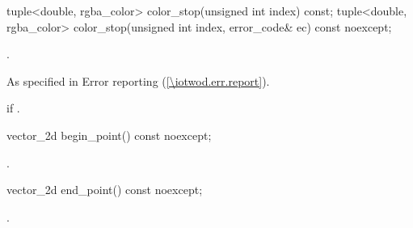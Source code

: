 \begin{itemdecl}
tuple<double, rgba_color> color_stop(unsigned int index) const;
tuple<double, rgba_color> color_stop(unsigned int index,
  error_code& ec) const noexcept;
\end{itemdecl}
\begin{itemdescr}
\pnum
\returns
{}.

\pnum
\throws
As specified in Error reporting (\ref{\iotwod.err.report}).

\pnum
\errors
{} if .
\end{itemdescr}

\begin{itemdecl}
vector_2d begin_point() const noexcept;
\end{itemdecl}
\begin{itemdescr}
\pnum
\returns
{}.
\end{itemdescr}

\begin{itemdecl}
vector_2d end_point() const noexcept;
\end{itemdecl}
\begin{itemdescr}
\pnum
\returns
{}.
\end{itemdescr}

